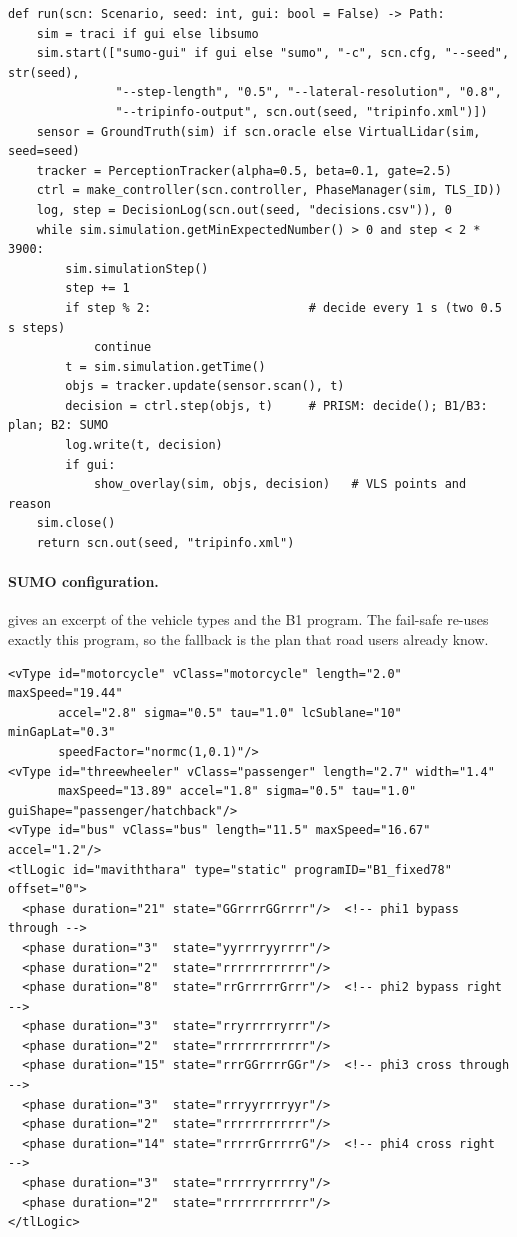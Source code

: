 \begin{lstlisting}[style=py,caption={Simulation loop (\texttt{experiments/run\_experiment.py})},label={lst:impl-loop}]
def run(scn: Scenario, seed: int, gui: bool = False) -> Path:
    sim = traci if gui else libsumo
    sim.start(["sumo-gui" if gui else "sumo", "-c", scn.cfg, "--seed", str(seed),
               "--step-length", "0.5", "--lateral-resolution", "0.8",
               "--tripinfo-output", scn.out(seed, "tripinfo.xml")])
    sensor = GroundTruth(sim) if scn.oracle else VirtualLidar(sim, seed=seed)
    tracker = PerceptionTracker(alpha=0.5, beta=0.1, gate=2.5)
    ctrl = make_controller(scn.controller, PhaseManager(sim, TLS_ID))
    log, step = DecisionLog(scn.out(seed, "decisions.csv")), 0
    while sim.simulation.getMinExpectedNumber() > 0 and step < 2 * 3900:
        sim.simulationStep()
        step += 1
        if step % 2:                      # decide every 1 s (two 0.5 s steps)
            continue
        t = sim.simulation.getTime()
        objs = tracker.update(sensor.scan(), t)
        decision = ctrl.step(objs, t)     # PRISM: decide(); B1/B3: plan; B2: SUMO
        log.write(t, decision)
        if gui:
            show_overlay(sim, objs, decision)   # VLS points and reason
    sim.close()
    return scn.out(seed, "tripinfo.xml")
\end{lstlisting}

\paragraph{SUMO configuration.}  gives an excerpt of the vehicle types and the B1
program. The fail-safe re-uses exactly this program, so the fallback is the plan that road users
already know.

\begin{lstlisting}[style=xml,caption={Excerpt of \texttt{vtypes.add.xml} and the B1 signal program},label={lst:impl-xml}]
<vType id="motorcycle" vClass="motorcycle" length="2.0" maxSpeed="19.44"
       accel="2.8" sigma="0.5" tau="1.0" lcSublane="10" minGapLat="0.3"
       speedFactor="normc(1,0.1)"/>
<vType id="threewheeler" vClass="passenger" length="2.7" width="1.4"
       maxSpeed="13.89" accel="1.8" sigma="0.5" tau="1.0" guiShape="passenger/hatchback"/>
<vType id="bus" vClass="bus" length="11.5" maxSpeed="16.67" accel="1.2"/>
<tlLogic id="maviththara" type="static" programID="B1_fixed78" offset="0">
  <phase duration="21" state="GGrrrrGGrrrr"/>  <!-- phi1 bypass through -->
  <phase duration="3"  state="yyrrrryyrrrr"/>
  <phase duration="2"  state="rrrrrrrrrrrr"/>
  <phase duration="8"  state="rrGrrrrrGrrr"/>  <!-- phi2 bypass right   -->
  <phase duration="3"  state="rryrrrrryrrr"/>
  <phase duration="2"  state="rrrrrrrrrrrr"/>
  <phase duration="15" state="rrrGGrrrrGGr"/>  <!-- phi3 cross through  -->
  <phase duration="3"  state="rrryyrrrryyr"/>
  <phase duration="2"  state="rrrrrrrrrrrr"/>
  <phase duration="14" state="rrrrrGrrrrrG"/>  <!-- phi4 cross right    -->
  <phase duration="3"  state="rrrrryrrrrry"/>
  <phase duration="2"  state="rrrrrrrrrrrr"/>
</tlLogic>
\end{lstlisting}


